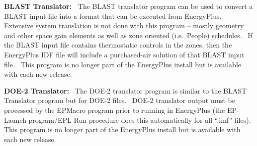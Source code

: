 \textbf{BLAST Translator:~} The BLAST translator program can be used to convert a BLAST input file into a format that can be executed from EnergyPlus.~ Extensive system translation is not done with this program -- mostly geometry and other space gain elements as well as zone oriented (i.e.~People) schedules.~ If the BLAST input file contains thermostatic controls in the zones, then the EnergyPlus IDF file will include a purchased-air solution of that BLAST input file.~ This program is no longer part of the EnergyPlus install but is available with each new release.

\textbf{DOE-2 Translator:}~ The DOE-2 translator program is similar to the BLAST Translator program but for DOE-2 files.~ DOE-2 translator output must be processed by the EPMacro program prior to running in EnergyPlus (the EP-Launch program/EPL-Run procedure does this automatically for all ``.imf'' files).~ This program is no longer part of the EnergyPlus install but is available with each new release.
